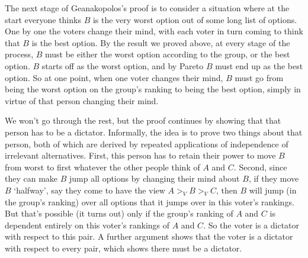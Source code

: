The next stage of Geanakopolos's proof is to consider a situation where at the start everyone thinks $B$ is the very worst option out of some long list of options. One by one the voters change their mind, with each voter in turn coming to think that $B$ is the best option. By the result we proved above, at every stage of the process, $B$ must be either the worst option according to the group, or the best option. $B$ starts off as the worst option, and by Pareto $B$ must end up as the best option. So at one point, when one voter changes their mind, $B$ must go from being the worst option on the group's ranking to being the best option, simply in virtue of that person changing their mind.

We won't go through the rest, but the proof continues by showing that that person has to be a dictator. Informally, the idea is to prove two things about that person, both of which are derived by repeated applications of independence of irrelevant alternatives. First, this person has to retain their power to move $B$ from worst to first whatever the other people think of $A$ and $C$. Second, since they can make $B$ jump all options by changing their mind about $B$, if they move $B$ `halfway', say they come to have the view $A >_V B >_V C$, then $B$ will jump (in the group's ranking) over all options that it jumps over in this voter's rankings. But that's possible (it turns out) only if the group's ranking of $A$ and $C$ is dependent entirely on this voter's rankings of $A$ and $C$. So the voter is a dictator with respect to this pair. A further argument shows that the voter is a dictator with respect to every pair, which shows there must be a dictator.